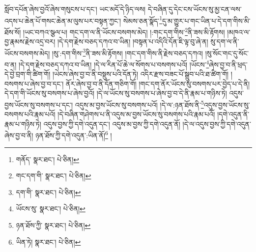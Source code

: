 སློབ་དཔོན་ཞེས་བྱའོ་ཞེས་གསུངས་པ་དང་། ཡང་མདོ་དེ་ཉིད་ལས། དེ་བཞིན་དུ་དེང་ངས་ཡོངས་སུ་མྱ་ངན་ལས་འདས་པ་ཆེན་པོ་གསང་ཆེན་མ་ལུས་པར་བསྟན་ཀྱང་། སེམས་ཅན་སྣོད་\footnote{གནོད་  སྣར་ཐང་།  པེ་ཅིན། }དུ་མ་གྱུར་པ་གང་ཡིན་པ་དེ་དག་གིས་མི་ཐོས་སོ། །ཡང་བཀའ་སྩལ་པ། གང་དག་ལ་ནི་ཡོངས་བསགས་མེད། །:གང་དག་གིས་\footnote{གང་དག་གི་  སྣར་ཐང་།  པེ་ཅིན། }ནི་ཟས་མི་རྟོགས། །མཁའ་ལ་བྱ་རྣམས་རྗེས་འདྲ་བར། །དེ་དག་རྗེས་བཅད་དཀའ་བ་ཡིན། །བསྟན་པ་འདིའི་དོན་ཇི་ལྟ་བུ་ཞེ་ན། སུ་དག་ལ་ནི་ཡོངས་བསགས་མེད། །སུ་:དག་གིས་\footnote{དག་གི་  སྣར་ཐང་།  པེ་ཅིན། }ནི་ཟས་མི་རྟོགས། །གང་དག་གིས་ནི་རྗེས་བཅད་དཀའ། །སུ་སོང་གང་དུ་སོང་བ་ན། །དེ་དག་རྗེས་བཅད་དཀའ་བ་ཡིན། །དེ་ལ་རིན་པོ་ཆེ་ལ་སོགས་པ་བསགས་པའོ། །ཡོངས་\footnote{ཡོངས་སུ་  སྣར་ཐང་།  པེ་ཅིན། }ཞེས་བྱ་བ་ནི་ཕྲད་དེ་བྱེ་བྲག་གི་ཚིག་གོ། །ཡེངས་ཞེས་བྱ་བ་ནི་བསྡུས་པའི་དོན་ཏེ། འདིར་རྫས་བཟང་པོ་སྒྲུབ་པའི་ཐ་ཚིག་གོ། །བསགས་པ་ཞེས་བྱ་བ་དང་། ནོར་ཞེས་བྱ་བ་ནི་དོན་གཅིག་གོ། །གང་དག་ནོར་ཡོངས་སུ་བསགས་པར་བྱེད་པ་དེ་ནི། དེ་དག་གི་ཡོངས་སུ་བསགས་པ་ཞེས་བྱའོ། །དེ་ལ་ཡོངས་སུ་བསགས་པ་ཞེས་བྱ་བ་དེ་ནི་རྣམ་པ་གཉིས་ཏེ། འདུས་བྱས་ཡོངས་སུ་བསགས་པ་དང་། འདུས་མ་བྱས་ཡོངས་སུ་བསགས་པའོ། །དེ་ལ་:ཉན་ཐོས་ནི་\footnote{ཉན་ཐོས་ཀྱི་  སྣར་ཐང་།  པེ་ཅིན། }འདུས་བྱས་ཡོངས་སུ་བསགས་པའི་རྣམ་པའོ། །དེ་བཞིན་གཤེགས་པ་ནི་འདུས་མ་བྱས་ཡོངས་སུ་བསགས་པའི་རྣམ་པའོ། །དགེ་འདུན་ནི་རྣམ་པ་གཉིས་ཏེ། འདུས་བྱས་ཀྱི་དགེ་འདུན་དང་། འདུས་མ་བྱས་ཀྱི་དགེ་འདུན་ནོ། །དེ་ལ་འདུས་བྱས་ཀྱི་དགེ་འདུན་ཞེས་བྱ་བ་ནི། ཉན་ཐོས་ཀྱི་དགེ་འདུན་:ཡིན་ནོ།\footnote{ཡིན་ཏེ།  སྣར་ཐང་།  པེ་ཅིན། } །
